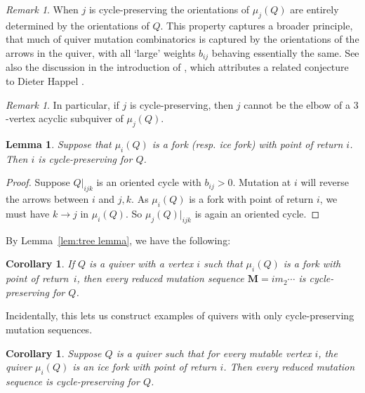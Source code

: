 \documentclass[12pt]{amsart}
\newcommand{\cS}[1]{{\noindent\textsf{\color{purple}$\blacksquare$~#1~$\blacksquare$}}}
\newtheorem{cor}[thm]{Corollary}
\newtheorem{lem}[thm]{Lemma}
\theoremstyle{definition}
\theoremstyle{remark}
\newtheorem{rem}[thm]{Remark}
\numberwithin{equation}{section}
\begin{document}
\begin{rem}
When $j$ is cycle-preserving the orientations of $\mu_j(Q)$ are entirely determined by the orientations of $Q$.
This property captures a broader principle, that much of quiver mutation combinatorics is captured by the orientations of the arrows in the quiver, with all `large' weights $b_{ij}$ behaving essentially the same.
See also the discussion in the introduction of \cite{Warkentin}, which attributes a related conjecture to Dieter Happel \cite{happel2009reconstruction}. %
\end{rem}


\begin{rem}
In particular, if $j$ is cycle-preserving, then $j$ cannot be the elbow of a $3$-vertex acyclic subquiver of $\mu_j(Q)$.
\end{rem}

\begin{lem}
\label{lem:forks preserve}
Suppose that $\mu_i(Q)$ is a fork (resp. ice fork) with point of return $i$.
Then $i$ is cycle-preserving for $Q$.
\end{lem}

\begin{proof}
Suppose $Q|_{ijk}$ is an oriented cycle with $b_{ij} > 0$.
Mutation at $i$ will reverse the arrows between $i$ and $j,k$. 
As $\mu_i(Q)$ is a fork with point of return $i$, we must have $k \rightarrow j$ in $\mu_i(Q)$. So $\mu_j(Q)|_{ijk}$ is again an oriented cycle.
\end{proof}

By Lemma~\ref{lem:tree lemma}, we have the following: 

\begin{cor}
\label{cor: cycle-preserving tree lem}
If $Q$ is a quiver with a vertex $i$ such that $\mu_i(Q)$ is a fork with point of return~$i$, then every reduced mutation sequence $\mathbf M = i m_2 \cdots$ is cycle-preserving for $Q$.
\end{cor}

Incidentally, this lets us construct examples of quivers with only cycle-preserving mutation sequences.

\begin{cor}
\label{cor: if all forks then all sequences preserve all cycles}
Suppose $Q$ is a quiver such that for every mutable vertex $i$, the quiver $\mu_i(Q)$ is an ice fork with point of return $i$. 
Then every reduced mutation sequence is cycle-preserving for $Q$.
\end{cor}
\end{document}
